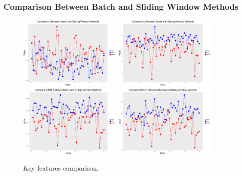 \subsubsection{Comparison Between Batch and Sliding Window Methods}

\begin{figure}[h]
\centering
\includegraphics[width=0.45\textwidth]{Chapters/05MCMCOU/plots/realdatacomparea1batchwindow.pdf}
\includegraphics[width=0.45\textwidth]{Chapters/05MCMCOU/plots/realdatacomparea2batchwindow.pdf}
\includegraphics[width=0.45\textwidth]{Chapters/05MCMCOU/plots/realdatacompareeffutbatchwindow.pdf}
\includegraphics[width=0.45\textwidth]{Chapters/05MCMCOU/plots/realdatacompareessutbatchwindow.pdf}
\caption{Key features comparison. }\label{batchwindowkeyfeature}
\end{figure}

